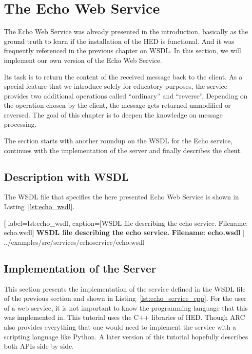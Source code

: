 \chapter{The Echo Web Service}

The Echo Web Service was already presented in the introduction, 
basically as the ground truth to learn if the installation of
the HED is functional. And it was frequently referenced in the previous chapter
on WSDL. In this section, we will implement our own version of the Echo
Web Service.

Its task is to return the content of the received message back to the client.
As a special feature that we introduce solely for educatory purposes, the
service provides two additional operations called ``ordinary'' and ``reverse''.
Depending on the operation chosen by the client, the message gets returned
unmodified or reversed. The goal of this chapter is to deepen the knowledge
on message processing.

The section starts with another roundup on the WSDL for the Echo service,
continues with the implementation of the server and finally describes the
client.

\section{Description with WSDL}

The WSDL file that specifies the here presented Echo Web Service is shown in
Listing~\ref{lst:echo_wsdl}.

	[
	label=lst:echo_wsdl,
	caption={[WSDL file describing the echo service. Filename: echo.wsdl]
	\textbf{WSDL file describing the echo service. Filename: echo.wsdl}}
	]
{../examples/src/services/echoservice/echo.wsdl}


\section{Implementation of the Server}

This section presents the implementation of the service defined in the WSDL
file of the previous section and shown in
Listing~\ref{lst:echo_service_cpp}. For the user of a web service, it is not
important to know the programming language that this was implemented in. This
tutorial uses the C++ libraries of HED. Though ARC also provides everything
that one would need to implement the service with a scripting language like
Python. A later version of this tutorial hopefully describes both APIs side by
side.

